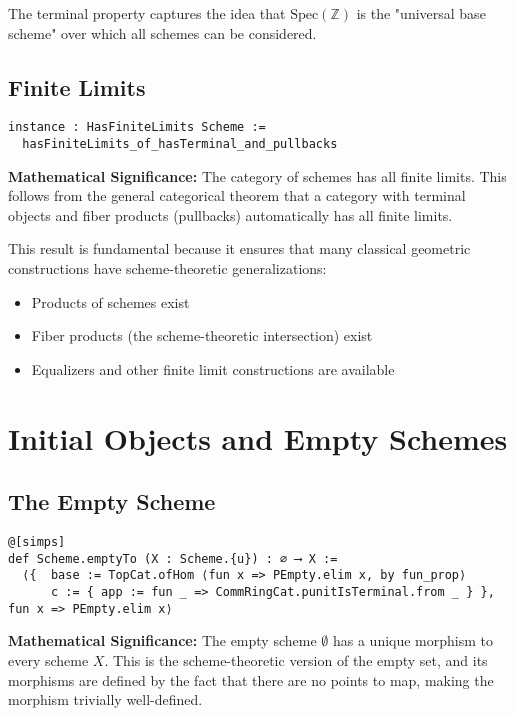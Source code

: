 \documentclass{article}
\theoremstyle{definition}
\begin{document}
The terminal property captures the idea that $\mathrm{Spec}(\mathbb{Z})$ is the "universal base scheme" over which all schemes can be considered.

\subsection{Finite Limits}

\begin{lstlisting}
instance : HasFiniteLimits Scheme :=
  hasFiniteLimits_of_hasTerminal_and_pullbacks
\end{lstlisting}

\textbf{Mathematical Significance:} The category of schemes has all finite limits. This follows from the general categorical theorem that a category with terminal objects and fiber products (pullbacks) automatically has all finite limits.

This result is fundamental because it ensures that many classical geometric constructions have scheme-theoretic generalizations:
\begin{itemize}
\item Products of schemes exist
\item Fiber products (the scheme-theoretic intersection) exist
\item Equalizers and other finite limit constructions are available
\end{itemize}

\section{Initial Objects and Empty Schemes}

\subsection{The Empty Scheme}

\begin{lstlisting}
@[simps]
def Scheme.emptyTo (X : Scheme.{u}) : ∅ ⟶ X :=
  ⟨{  base := TopCat.ofHom ⟨fun x => PEmpty.elim x, by fun_prop⟩
      c := { app := fun _ => CommRingCat.punitIsTerminal.from _ } }, fun x => PEmpty.elim x⟩
\end{lstlisting}

\textbf{Mathematical Significance:} The empty scheme $\emptyset$ has a unique morphism to every scheme $X$. This is the scheme-theoretic version of the empty set, and its morphisms are defined by the fact that there are no points to map, making the morphism trivially well-defined.
\end{document}
